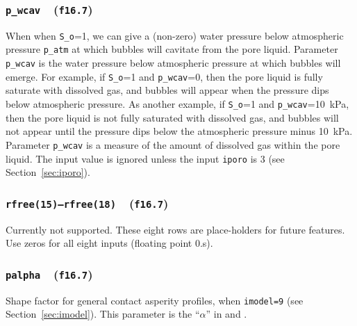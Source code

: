 \documentclass[letterpaper,11pt]{article}
\newcommand{\Var}[2]{\texttt{#1}\ \  (\texttt{#2})}
\begin{document}
\subsubsection[\texttt{p\_wcav}]{\Var{p\_wcav}{f16.7}}\label{sec:pwcav}
When when \texttt{S\_o}=1,
we can give a (non-zero) water pressure below
atmospheric pressure \texttt{p\_atm} at
which bubbles will cavitate from the pore liquid.
Parameter \texttt{p\_wcav} is the water pressure
below atmospheric pressure at which bubbles will emerge.
For example, if \texttt{S\_o}=1 and \texttt{p\_wcav}=0,
then the pore liquid is fully saturate with dissolved
gas, and bubbles will appear when the pressure dips
below atmospheric pressure.
As another example, if \texttt{S\_o}=1 and \texttt{p\_wcav}=10~kPa,
then the pore liquid is not fully saturated with dissolved
gas, and bubbles will not appear until the pressure
dips below the atmospheric pressure minus 10~kPa.
Parameter \texttt{p\_wcav} is a measure of the amount
of dissolved gas within the pore liquid.
The input value is ignored unless the input
\texttt{iporo} is 3 (see Section~\ref{sec:iporo}).
%
\subsubsection[\texttt{rfree}]{\Var{rfree(15)--rfree(18)}{f16.7}}\label{sec:rfree}
Currently not supported.
These eight rows are place-holders for future features.
Use zeros for all eight inputs (floating point 0.s).
%
\subsubsection[\texttt{palpha}]{\Var{palpha}{f16.7}}\label{sec:palpha}
Shape factor for general contact asperity profiles,
when \texttt{imodel=9}
(see Section~\ref{sec:imodel}).
This parameter is the ``$\alpha$'' in
\cite{Jager:1999a} and \citep{Kuhn:2014c}.
%
%
\end{document}
